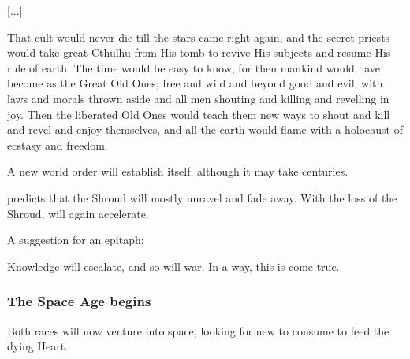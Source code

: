 \begin{garbage}
{  [...]
  
  That cult would never die till the stars came right again, and the secret priests would take great Cthulhu from His tomb to revive His subjects and resume His rule of earth. The time would be easy to know, for then mankind would have become as the Great Old Ones; free and wild and beyond good and evil, with laws and morals thrown aside and all men shouting and killing and revelling in joy. Then the liberated Old Ones would teach them new ways to shout and kill and revel and enjoy themselves, and all the earth would flame with a holocaust of ecstasy and freedom.
}

A new world order will establish itself, although it may take centuries. 

\Ishnaruchaefir{} predicts that the Shroud will mostly unravel and fade away. With the loss of the Shroud,  will again accelerate. 

A suggestion for an epitaph: 


Knowledge will escalate, and so will war. 
In a way, this is  come true. 






\subsubsection{The Space Age begins}
Both races will now venture into space, looking for new \dweomers{} to consume to feed the dying Heart. 





\end{garbage}
